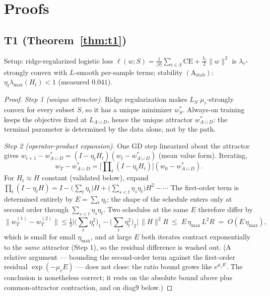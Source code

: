 \documentclass{article}
\newcommand{\Expo}{E}         %
\begin{document}
\section{Proofs}
\label{app:proofs}
\subsection{T1 (Theorem~\ref{thm:t1})}
Setup: ridge-regularized logistic loss $\ell(w;S)=\frac1{|S|}\sum_{i\in S}\mathrm{CE}
+\frac{\lambda_r}{2}\|w\|^2$ is $\lambda_r$-strongly convex with $L$-smooth per-sample terms;
stability $(\mathrm{A}_{\mathrm{stab}})$: $\eta_t\lambda_{\max}(H_t)<1$ (measured $0.041$).
\begin{proof}[Proof]
\emph{Step 1 (unique attractor).} Ridge regularization makes $L_S$ $\mu_r$-strongly convex for
every subset $S$, so it has a unique minimizer $w^*_S$. Always-on training keeps the objective
fixed at $L_{A\cup D}$, hence the unique attractor $w^*_{A\cup D}$: the terminal parameter is
determined by the data alone, not by the path.

\emph{Step 2 (operator-product expansion).} One GD step linearized about the attractor gives
$w_{t+1}-w^*_{A\cup D}=(I-\eta_t H_t)(w_t-w^*_{A\cup D})$ (mean value form). Iterating,
\begin{equation}
w_T-w^*_{A\cup D}=\Big[\prod\nolimits_t (I-\eta_t H_t)\Big](w_0-w^*_{A\cup D}).
\end{equation}
For $H_t\approx H$ constant (validated below), expand
$\prod_t(I-\eta_t H)=I-\big(\sum_t\eta_t\big)H+\big(\sum_{s<t}\eta_s\eta_t\big)H^2-\cdots$
The first-order term is determined entirely by $\Expo=\sum_t\eta_t$; the shape of the schedule
enters only at second order through $\sum_{s<t}\eta_s\eta_t$. Two schedules at the same $\Expo$
therefore differ by
\begin{equation}
\|w_T^{(1)}-w_T^{(2)}\|
\le \tfrac12\Big|\Big(\textstyle\sum_t\eta_t^2\Big)_1-\Big(\sum_t\eta_t^2\Big)_2\Big|\,\|H\|^2 R
\;\le\; \Expo\,\eta_{\max}\,L^2 R \;=\; O(\Expo\,\eta_{\max}),
\end{equation}
which is small for small $\eta_{\max}$, and at large $\Expo$ both iterates contract
exponentially to the \emph{same} attractor (Step 1), so the residual difference is washed out.
(A relative argument --- bounding the second-order term against the first-order residual
$\exp(-\mu_r\Expo)$ --- does not close: the ratio bound grows like $e^{\mu_r\Expo}$. The
conclusion is nonetheless correct; it rests on the absolute bound above plus common-attractor
contraction, and on diag9 below.)


\end{proof}
\end{document}
